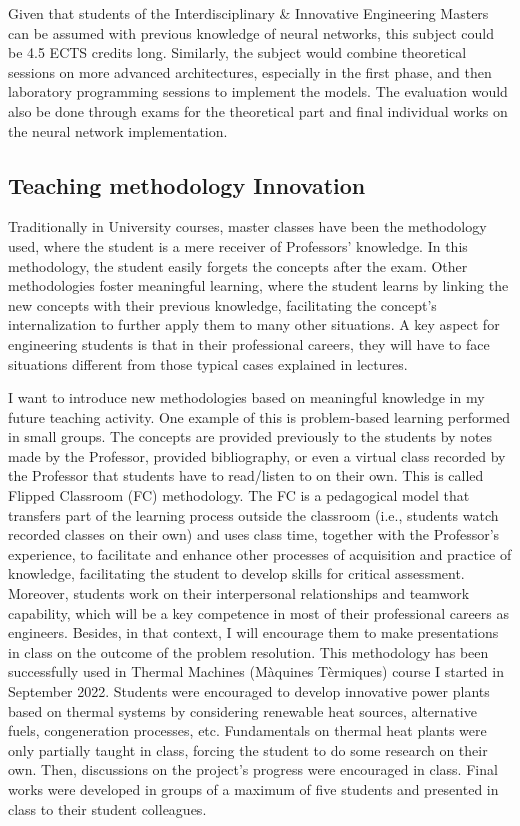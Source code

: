 \documentclass{article}
\begin{document}
Given that students of the Interdisciplinary \& Innovative Engineering Masters can be assumed with previous knowledge of neural networks, this subject could be 4.5 ECTS credits long. Similarly, the subject would combine theoretical sessions on more advanced architectures, especially in the first phase, and then laboratory programming sessions to implement the models. The evaluation would also be done through exams for the theoretical part and final individual works on the neural network implementation. 

\subsection{Teaching methodology Innovation}

Traditionally in University courses, master classes have been the methodology used, where the student is a mere receiver of Professors' knowledge. In this methodology, the student easily forgets the concepts after the exam. Other methodologies foster meaningful learning, where the student learns by linking the new concepts with their
previous knowledge, facilitating the concept's internalization to further apply them to many other situations. A key aspect for engineering students is that in their professional careers, they will have to face situations different from those typical cases explained in lectures. 

I want to introduce new methodologies based on meaningful knowledge in my future teaching activity. One example of this is problem-based learning performed in small groups. The concepts are provided previously to the students by notes made by the Professor, provided bibliography, or even a virtual class recorded by the Professor that students have to read/listen to on their own. This is called Flipped Classroom (FC) methodology. The FC is a pedagogical model that transfers part of the learning process outside the classroom (i.e., students watch recorded classes on their own) and uses class time, together with the Professor's experience, to facilitate and enhance other processes of acquisition and practice of knowledge, facilitating the student to develop skills for critical assessment. Moreover, students work on their interpersonal relationships and teamwork capability, which will be a key competence in most of their professional careers as engineers. Besides, in that context, I will encourage them to make presentations in class on the outcome of the problem resolution.
This methodology has been successfully used in Thermal Machines (Màquines Tèrmiques) course I started in September 2022. Students were encouraged to develop innovative power plants based on thermal systems by considering renewable heat sources, alternative fuels, congeneration processes, etc. Fundamentals on thermal heat plants were only partially taught in class, forcing the student to do some research on their own. Then, discussions on the project's progress were encouraged in class. Final works were developed in groups of a maximum of five students and presented in class to their student colleagues.
\end{document}
